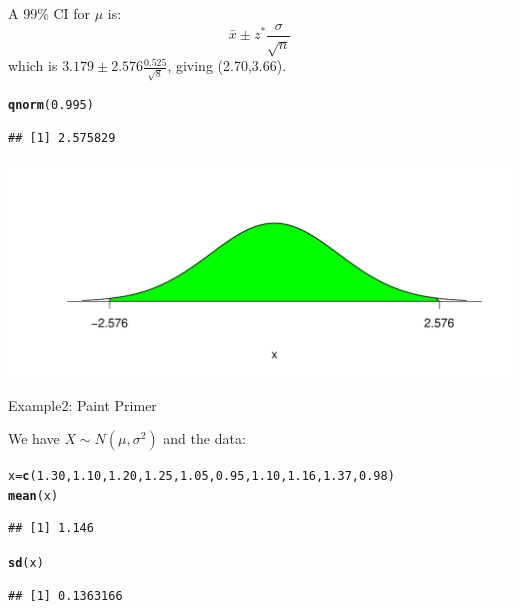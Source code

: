 \documentclass[t,xcolor=pdftex,dvipsnames,table]{beamer}\usepackage[]{graphicx}\usepackage[]{color}
\makeatletter
\def\maxwidth{ %
  \ifdim\Gin@nat@width>\linewidth
    \linewidth
  \else
    \Gin@nat@width
  \fi
}
\newcommand{\hlnum}[1]{\textcolor[rgb]{0.686,0.059,0.569}{#1}}%
\newcommand{\hlstd}[1]{\textcolor[rgb]{0.345,0.345,0.345}{#1}}%
\newcommand{\hlkwb}[1]{\textcolor[rgb]{0.69,0.353,0.396}{#1}}%
\newcommand{\hlkwd}[1]{\textcolor[rgb]{0.737,0.353,0.396}{\textbf{#1}}}%
\newenvironment{kframe}{%
 \def\at@end@of@kframe{}%
 \ifinner\ifhmode%
  \def\at@end@of@kframe{\end{minipage}}%
  \begin{minipage}{\columnwidth}%
 \fi\fi%
 \def\FrameCommand##1{\hskip\@totalleftmargin \hskip-\fboxsep
 \colorbox{shadecolor}{##1}\hskip-\fboxsep
     \hskip-\linewidth \hskip-\@totalleftmargin \hskip\columnwidth}%
 \MakeFramed {\advance\hsize-\width
   \@totalleftmargin\z@ \linewidth\hsize
   \@setminipage}}%
 {\par\unskip\endMakeFramed%
 \at@end@of@kframe}
\newenvironment{knitrout}{}{} %
\makeatother
\begin{document}
\begin{frame}[fragile]{}

A 99\% CI for $\mu$ is: 
\[ \bar{x}  \pm z^{*} \frac{\sigma}{\sqrt{n}} \]
which is $3.179  \pm 2.576 \frac{0.525}{\sqrt{8}}$, giving (2.70,3.66).

\begin{knitrout}
\color{fgcolor}\begin{kframe}
\begin{alltt}
\hlkwd{qnorm}\hlstd{(}\hlnum{0.995}\hlstd{)}
\end{alltt}
\begin{verbatim}
## [1] 2.575829
\end{verbatim}
\end{kframe}
\end{knitrout}

\begin{knitrout}
\color{fgcolor}
\includegraphics[width=\maxwidth]{figure/unnamed-chunk-183-1} 

\end{knitrout}
\end{frame}



\begin{frame}[fragile]{Example2: Paint Primer}

We have $X \sim N(\mu,\sigma^2)$ and the data:

\begin{knitrout}
\color{fgcolor}\begin{kframe}
\begin{alltt}
\hlstd{x}\hlkwb{=}\hlkwd{c}\hlstd{(}\hlnum{1.30}\hlstd{,}\hlnum{1.10}\hlstd{,}\hlnum{1.20}\hlstd{,}\hlnum{1.25}\hlstd{,}\hlnum{1.05}\hlstd{,}\hlnum{0.95}\hlstd{,}\hlnum{1.10}\hlstd{,}\hlnum{1.16}\hlstd{,}\hlnum{1.37}\hlstd{,}\hlnum{0.98}\hlstd{)}
\hlkwd{mean}\hlstd{(x)}
\end{alltt}
\begin{verbatim}
## [1] 1.146
\end{verbatim}
\begin{alltt}
\hlkwd{sd}\hlstd{(x)}
\end{alltt}
\begin{verbatim}
## [1] 0.1363166
\end{verbatim}
\end{kframe}
\end{knitrout}
\end{frame}
\end{document}
